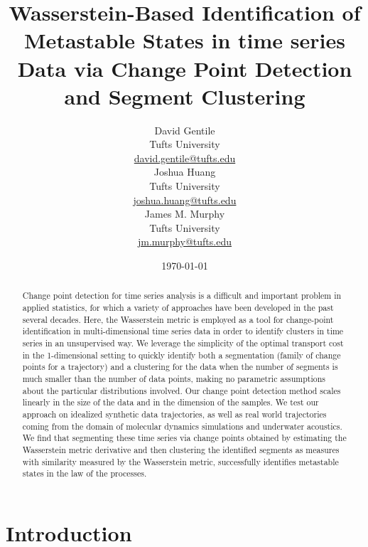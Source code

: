 \documentclass{article}
\author{
David Gentile \\
Tufts University \\
\url{david.gentile@tufts.edu} \\
\And Joshua Huang \\
Tufts University \\
\url{joshua.huang@tufts.edu} \\
\And James M. Murphy\\
Tufts University \\ 
\url{jm.murphy@tufts.edu}}
\date{\today}
\begin{document}
\title{Wasserstein-Based Identification of Metastable States in time series Data via Change Point Detection and Segment Clustering}
\maketitle
\begin{abstract}
   Change point detection for time series analysis is a difficult and important problem in applied statistics, for which a variety of approaches have been developed in the past several decades. Here, the Wasserstein metric is employed as a tool for change-point identification in multi-dimensional time series data in order to identify clusters in time series in an unsupervised way.  We leverage the simplicity of the optimal transport cost in the 1-dimensional setting to quickly identify both a segmentation (family of change points for a trajectory) and a clustering for the data when the number of segments is much smaller than the number of data points, making no parametric assumptions about the particular distributions involved. Our change point detection method scales linearly in the size of the data and in the dimension of the samples. We test our approach on idealized synthetic data trajectories, as well as real world trajectories coming from the domain of molecular dynamics simulations and underwater acoustics. We find that segmenting these time series via change points obtained by estimating the Wasserstein metric derivative and then clustering the identified segments as measures with similarity measured by the Wasserstein metric, successfully identifies metastable states in the law of the processes.
\end{abstract}
\section{Introduction}
\label{Introduction}
\end{document}
